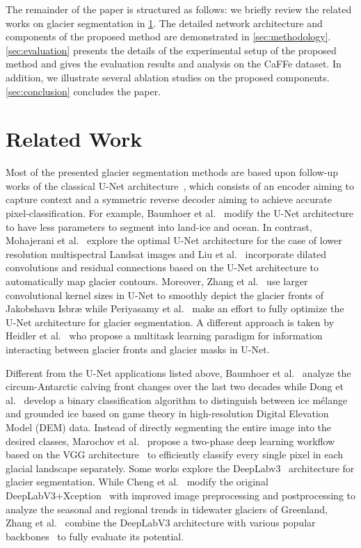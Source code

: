 \documentclass[lettersize,journal,siunitx]{IEEEtran}
\begin{document}
The remainder of the paper is structured as follows: we briefly review the related works on glacier segmentation in \cref{sec:related_work}. The detailed network architecture and components of the proposed method are demonstrated in \cref{sec:methodology}. \cref{sec:evaluation} presents the details of the experimental setup of the proposed method and gives the evaluation results and analysis on the CaFFe dataset. In addition, we illustrate several ablation studies on the proposed components. \cref{sec:conclusion} concludes the paper.


\section{Related Work}\label{sec:related_work}
Most of the presented glacier segmentation methods are based upon follow-up works of the classical U-Net architecture~\cite{ronneberger2015u}, which consists of an encoder aiming to capture context and a symmetric reverse decoder aiming to achieve accurate pixel-classification. For example, Baumhoer et al.~\cite{baumhoer2019automated} modify the U-Net architecture to have less parameters to segment into land-ice and ocean. In contrast, Mohajerani et al.~\cite{mohajerani2019detection} explore the optimal U-Net architecture for the case of lower resolution multispectral Landsat images and Liu et al.~\cite{liu2021multiscale} incorporate dilated convolutions and residual connections based on the U-Net architecture to automatically map glacier contours. Moreover, Zhang et al.~\cite{zhang2019automatically} use larger convolutional kernel sizes in U-Net to smoothly depict the glacier fronts of Jakobshavn Isbræ while Periyasamy et al.~\cite{periyasamy2022get} make an effort to fully optimize the U-Net architecture for glacier segmentation. A different approach is taken by Heidler et al.~\cite{heidler2021hed} who propose a multitask learning paradigm for information interacting between glacier fronts and glacier masks in U-Net.

Different from the U-Net applications listed above, Baumhoer et al.~\cite{baumhoer2021environmental} analyze the circum-Antarctic calving front changes over the last two decades while Dong et al.~\cite{dong2022automatic} develop a binary classification algorithm to distinguish between ice mélange and grounded ice based on game theory in high-resolution Digital Elevation Model (DEM) data. Instead of directly segmenting the entire image into the desired classes, Marochov et al.~\cite{marochov2021image} propose a two-phase deep learning workflow based on the VGG architecture~\cite{simonyan2014very} to efficiently classify every single pixel in each  glacial landscape separately. Some works explore the DeepLabv3~\cite{chen2017rethinking} architecture for glacier segmentation. While Cheng et al.~\cite{cheng2021calving} modify the original DeepLabV3+Xception~\cite{chen2018encoder} with improved image preprocessing and postprocessing to analyze the seasonal and regional trends in tidewater glaciers of Greenland, Zhang et al.~\cite{zhang2021automated} combine the DeepLabV3 architecture with various popular backbones~\cite{he2016deep,yu2017dilated,howard2017mobilenets} to fully evaluate its potential.
\end{document}
